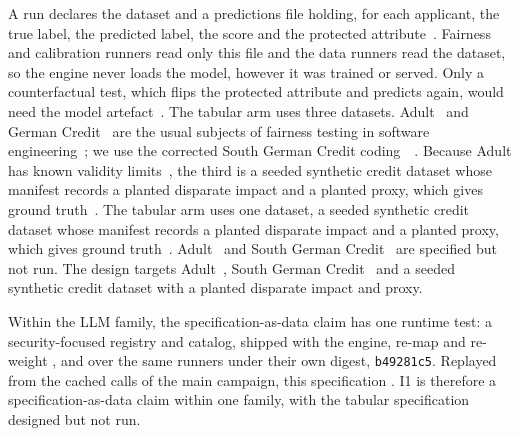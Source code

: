 A run declares the dataset and a predictions file holding, for each applicant, the true label, the predicted label, the score and the protected attribute~.
Fairness and calibration runners read only this file and the data runners read the dataset, so the engine never loads the model, however it was trained or served.
Only a counterfactual test, which flips the protected attribute and predicts again, would need the model artefact~.
\ifarmfull
The tabular arm uses three datasets.
Adult~\cite{becker1996adult} and German Credit~\cite{hofmann1994statlog} are the usual subjects of fairness testing in software engineering~\cite{chen2024fairness}; we use the corrected South German Credit coding~\cite{gromping2019south}~.
Because Adult has known validity limits~\cite{ding2021retiring}, the third is a seeded synthetic credit dataset whose manifest records a planted disparate impact and a planted proxy, which gives ground truth~.
\fi
\ifarmreduced
The tabular arm uses one dataset, a seeded synthetic credit dataset whose manifest records a planted disparate impact and a planted proxy, which gives ground truth~.
Adult~\cite{becker1996adult} and South German Credit~\cite{hofmann1994statlog,gromping2019south} are specified but not run.
\fi
\ifarmwithdrawn
The design targets Adult~\cite{becker1996adult}, South German Credit~\cite{hofmann1994statlog,gromping2019south} and a seeded synthetic credit dataset with a planted disparate impact and proxy.

Within the LLM family, the specification-as-data claim has one runtime test: a security-focused registry and catalog, shipped with the engine, re-map and re-weight ,  and  over the same runners under their own digest, \texttt{b49281c5}.
Replayed from the cached calls of the main campaign, this specification .
I1 is therefore a specification-as-data claim within one family, with the tabular specification designed but not run.
\fi
